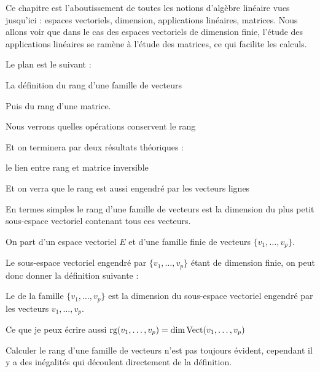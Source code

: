 







\debuttexte


\diapo


Ce chapitre est l'aboutissement de toutes les notions d'algèbre linéaire 
vues jusqu'ici : espaces vectoriels, dimension, applications linéaires, matrices.
Nous allons voir que dans le cas des espaces vectoriels de dimension finie, 
l'étude des applications linéaires se ramène à l'étude des matrices, ce qui
facilite les calculs.

\change
Le plan est le suivant :

\change
La définition du rang d'une famille de vecteurs

\change
Puis du rang d'une matrice.

\change
Nous verrons quelles opérations conservent le rang

\change
Et on terminera par deux résultats théoriques :

le lien entre rang et matrice inversible

\change
Et on verra que le rang est aussi engendré par les vecteurs lignes


\diapo

\change
En termes simples le rang d'une famille de vecteurs est la dimension du plus petit sous-espace
vectoriel contenant tous ces vecteurs.



On part d'un espace vectoriel $E$  et d'une
famille finie de vecteurs $\{v_1, \ldots ,v_p\}$. 

\change
Le sous-espace vectoriel  engendré par $\{v_1, \ldots ,v_p\}$ étant de dimension
finie, on peut donc donner la définition suivante :

\change
Le  de la famille $\{v_1, \ldots ,v_p\}$ 
est la dimension du sous-espace vectoriel 
engendré par les vecteurs $v_1, \dots ,v_p$.

\change
Ce que je peux écrire aussi 
$\mathop{\text{rg}}\nolimits(v_1, \dots ,v_p) = \dim \mathop{\text{Vect}}\nolimits(v_1, \ldots ,v_p)$

\change
Calculer le rang d'une famille de vecteurs n'est pas toujours évident, cependant
il y a des inégalités qui découlent directement de la définition.

